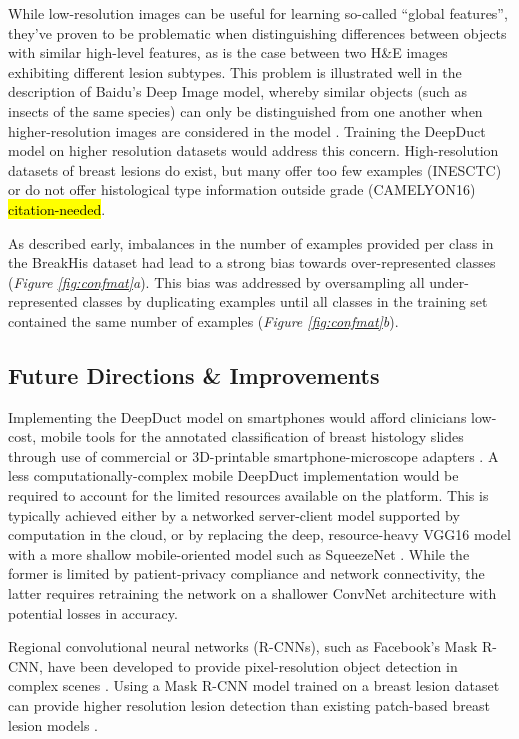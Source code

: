 While low-resolution images can be useful for learning so-called ``global features'', they've proven to be problematic when distinguishing differences between objects with similar high-level features, as is the case between two H\&E images exhibiting different lesion subtypes. This problem is illustrated well in the description of Baidu's Deep Image model, whereby similar objects (such as insects of the same species) can only be distinguished from one another when higher-resolution images are considered in the model \citep{baidudeepimage}. Training the DeepDuct model on higher resolution datasets would address this concern. High-resolution datasets of breast lesions do exist, but many offer too few examples (INESCTC) or do not offer histological type information outside grade (CAMELYON16) \hl{citation-needed}.

As described early, imbalances in the number of examples provided per class in the BreakHis dataset had lead to a strong bias towards over-represented classes (\textit{Figure \ref{fig:confmat}a}). This bias was addressed by oversampling all under-represented classes by duplicating examples until all classes in the training set contained the same number of examples (\textit{Figure \ref{fig:confmat}b}).

\subsection{Future Directions \& Improvements}

Implementing the DeepDuct model on smartphones would afford clinicians low-cost, mobile tools for the annotated classification of breast histology slides through use of commercial or 3D-printable smartphone-microscope adapters \citep{cellphone_microscope_platform}. A less computationally-complex mobile DeepDuct implementation would be required to account for the limited resources available on the platform. This is typically achieved either by a networked server-client model supported by computation in the cloud, or by replacing the deep, resource-heavy VGG16 model with a more shallow mobile-oriented model such as SqueezeNet \citep{squeezenet}. While the former is limited by patient-privacy compliance and network connectivity, the latter requires retraining the network on a shallower ConvNet architecture with potential losses in accuracy.

Regional convolutional neural networks (R-CNNs), such as Facebook's Mask R-CNN, have been developed to provide pixel-resolution object detection in complex scenes \citep{mask_r_cnn}. Using a Mask R-CNN model trained on a breast lesion dataset can provide higher resolution lesion detection than existing patch-based breast lesion models \citep{wang2016}.

